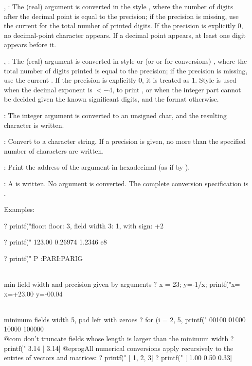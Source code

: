 \item {}, : The (real) argument is converted in the style
, where the number of digits after the decimal point
is equal to the precision; if the precision is missing, use the current
 for the total number of printed digits. If the precision
is explicitly 0, no decimal-point character appears. If a decimal point
appears, at least one digit appears before it.

\item {}, : The (real) argument is converted in style
 or  (or  or  for  conversions)
, where the total number of digits printed
is equal to the precision; if the precision is missing, use the current
. If the precision is explicitly 0, it is treated as 1.
Style  is used when
the decimal exponent is $< -4$, to print , or when the integer
part cannot be decided given the known significant digits, and the 
format otherwise.

\item {}: The integer argument is converted to an unsigned char, and the
resulting character is written.

\item {}: Convert to a character string. If a precision is given, no
more than the specified number of characters are written.

\item {}: Print the address of the argument in hexadecimal (as if by
).

\item \kbd{\%}: A \kbd{\%} is written. No argument is converted. The complete
conversion specification is \kbd{\%\%}.

\noindent Examples:

\bprog
? printf("floor: %
floor: 3, field width 3:   1, with sign:  +2

? printf("%
123.00 0.26974 1.2346 e8

? printf("%
P :PARI:PARIG

\\ min field width and precision given by arguments
? x = 23; y=-1/x; printf("x=%
x=+23.00 y=-00.04

\\ minimum fields width 5, pad left with zeroes
? for (i = 2, 5, printf("%
00100
01000
10000
100000  \\@com don't truncate fields whose length is larger than the minimum width
? printf("%
3.14  |  3.14|
@eprog\noindent All numerical conversions apply recursively to the entries
of vectors and matrices:
\bprog
? printf("%
[   1,   2,   3]
? printf("%
[ 1.00  0.50  0.33]

